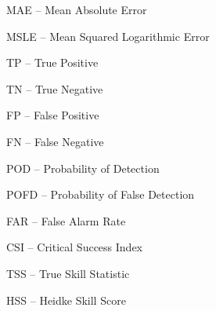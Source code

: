 MAE -- Mean Absolute Error

MSLE -- Mean Squared Logarithmic Error

TP -- True Positive

TN -- True Negative

FP -- False Positive

FN -- False Negative

POD -- Probability of Detection

POFD -- Probability of False Detection

FAR -- False Alarm Rate

CSI -- Critical Success Index

TSS -- True Skill Statistic

HSS -- Heidke Skill Score